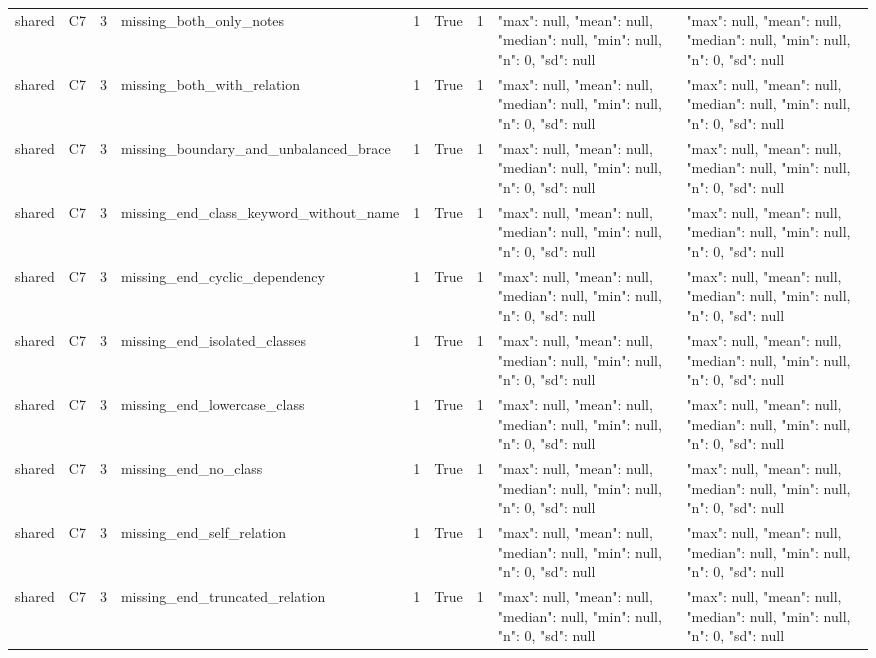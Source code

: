\begin{tabular}{lllllllll}
shared & C7 & 3 & missing\_both\_only\_notes & 1 & True & 1 & {"max": null, "mean": null, "median": null, "min": null, "n": 0, "sd": null} & {"max": null, "mean": null, "median": null, "min": null, "n": 0, "sd": null} \\
shared & C7 & 3 & missing\_both\_with\_relation & 1 & True & 1 & {"max": null, "mean": null, "median": null, "min": null, "n": 0, "sd": null} & {"max": null, "mean": null, "median": null, "min": null, "n": 0, "sd": null} \\
shared & C7 & 3 & missing\_boundary\_and\_unbalanced\_brace & 1 & True & 1 & {"max": null, "mean": null, "median": null, "min": null, "n": 0, "sd": null} & {"max": null, "mean": null, "median": null, "min": null, "n": 0, "sd": null} \\
shared & C7 & 3 & missing\_end\_class\_keyword\_without\_name & 1 & True & 1 & {"max": null, "mean": null, "median": null, "min": null, "n": 0, "sd": null} & {"max": null, "mean": null, "median": null, "min": null, "n": 0, "sd": null} \\
shared & C7 & 3 & missing\_end\_cyclic\_dependency & 1 & True & 1 & {"max": null, "mean": null, "median": null, "min": null, "n": 0, "sd": null} & {"max": null, "mean": null, "median": null, "min": null, "n": 0, "sd": null} \\
shared & C7 & 3 & missing\_end\_isolated\_classes & 1 & True & 1 & {"max": null, "mean": null, "median": null, "min": null, "n": 0, "sd": null} & {"max": null, "mean": null, "median": null, "min": null, "n": 0, "sd": null} \\
shared & C7 & 3 & missing\_end\_lowercase\_class & 1 & True & 1 & {"max": null, "mean": null, "median": null, "min": null, "n": 0, "sd": null} & {"max": null, "mean": null, "median": null, "min": null, "n": 0, "sd": null} \\
shared & C7 & 3 & missing\_end\_no\_class & 1 & True & 1 & {"max": null, "mean": null, "median": null, "min": null, "n": 0, "sd": null} & {"max": null, "mean": null, "median": null, "min": null, "n": 0, "sd": null} \\
shared & C7 & 3 & missing\_end\_self\_relation & 1 & True & 1 & {"max": null, "mean": null, "median": null, "min": null, "n": 0, "sd": null} & {"max": null, "mean": null, "median": null, "min": null, "n": 0, "sd": null} \\
shared & C7 & 3 & missing\_end\_truncated\_relation & 1 & True & 1 & {"max": null, "mean": null, "median": null, "min": null, "n": 0, "sd": null} & {"max": null, "mean": null, "median": null, "min": null, "n": 0, "sd": null} \\

\end{tabular}

